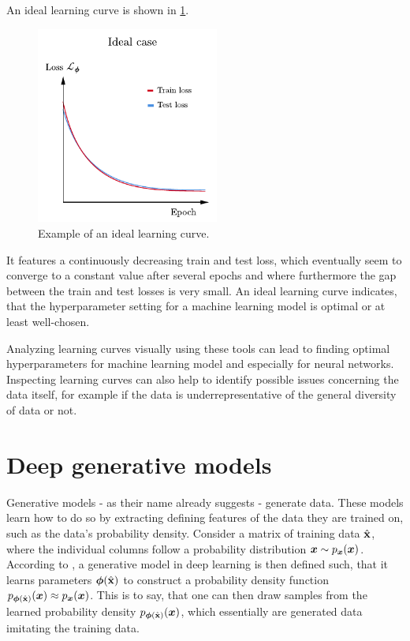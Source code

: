 \documentclass[a4paper,12pt]{report}
\begin{document}
An ideal learning curve is shown in \cref{fig:ideallearningcurve}.
\begin{figure}[h]
\centering
\includegraphics[width=6cm]{figures/ideallearningcurve.pdf}
\caption{Example of an ideal learning curve.}
\label{fig:ideallearningcurve}
\end{figure}
It features a continuously decreasing train and test loss, which eventually seem to converge to a constant value after several epochs and where furthermore the gap between the train and test losses is very small. An ideal learning curve indicates, that the hyperparameter setting for a machine learning model is optimal or at least well-chosen.

Analyzing learning curves visually using these tools can lead to finding optimal hyperparameters for machine learning model and especially for neural networks. Inspecting learning curves can also help to identify possible issues concerning the data itself, for example if the data is underrepresentative of the general diversity of data or not.

\section{Deep generative models}
Generative models - as their name already suggests - generate data. These models learn how to do so by extracting defining features of the data they are trained on, such as the data's probability density. Consider a matrix of training data $\hat{\boldsymbol{\mathbf{x}}}$, where the individual columns follow a probability distribution $\bm{x} \sim p_{\bm{x}}(\bm{x})$. According to \cite[p.593]{Raschka.2022}, a generative model in deep learning is then defined such, that it learns parameters $\bm{\phi}(\hat{\boldsymbol{\mathbf{x}}})$ to construct a probability density function $p_{\bm{\phi}(\hat{\boldsymbol{\mathbf{x}}})}(\bm{x}) \approx p_{\bm{x}}(\bm{x})$. This is to say, that one can then draw samples from the learned probability density $p_{\bm{\phi}(\hat{\boldsymbol{\mathbf{x}}})}(\bm{x})$, which essentially are generated data imitating the training data.
\end{document}
